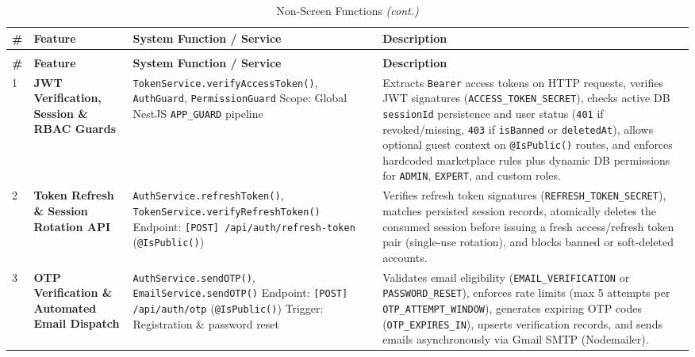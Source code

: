 \begin{longtable}{|C{0.7cm}|L{3.2cm}|S{5.4cm}|p{5.8cm}|}
\caption{Non-Screen Functions}
\label{tab:non-screen-functions} \\
\hline
{}
\textbf{\#} & \textbf{Feature} & \textbf{System Function / Service} & \textbf{Description} \\
\hline
\endfirsthead

\caption[]{Non-Screen Functions \textit{(cont.)}} \\
\hline
{}
\textbf{\#} & \textbf{Feature} & \textbf{System Function / Service} & \textbf{Description} \\
\hline
\endhead

\hline
\endfoot

\hline
\endlastfoot

1 &
\textbf{JWT Verification, Session \& RBAC Guards} &
\texttt{TokenService.\allowbreak{}verifyAccessToken()}, \texttt{AuthGuard}, \texttt{PermissionGuard} \newline
Scope: Global NestJS \texttt{APP\_GUARD} pipeline &
Extracts \texttt{Bearer} access tokens on HTTP requests, verifies JWT signatures (\texttt{ACCESS\_\allowbreak{}TOKEN\_\allowbreak{}SECRET}), checks active DB \texttt{sessionId} persistence and user status (\texttt{401} if revoked/missing, \texttt{403} if \texttt{isBanned} or \texttt{deletedAt}), allows optional guest context on \texttt{@IsPublic()} routes, and enforces hardcoded marketplace rules plus dynamic DB permissions for \texttt{ADMIN}, \texttt{EXPERT}, and custom roles.
\\ \hline

2 &
\textbf{Token Refresh \& Session Rotation API} &
\texttt{AuthService.\allowbreak{}refreshToken()}, \texttt{TokenService.\allowbreak{}verifyRefreshToken()} \newline
Endpoint: \texttt{[POST] /api/\allowbreak{}auth/\allowbreak{}refresh-token} (\texttt{@IsPublic()}) &
Verifies refresh token signatures (\texttt{REFRESH\_\allowbreak{}TOKEN\_\allowbreak{}SECRET}), matches persisted session records, atomically deletes the consumed session before issuing a fresh access/refresh token pair (single-use rotation), and blocks banned or soft-deleted accounts.
\\ \hline

3 &
\textbf{OTP Verification \& Automated Email Dispatch} &
\texttt{AuthService.\allowbreak{}sendOTP()}, \texttt{EmailService.\allowbreak{}sendOTP()} \newline
Endpoint: \texttt{[POST] /api/\allowbreak{}auth/otp} (\texttt{@IsPublic()}) \newline
Trigger: Registration \& password reset &
Validates email eligibility (\texttt{EMAIL\_\allowbreak{}VERIFICATION} or \texttt{PASSWORD\_\allowbreak{}RESET}), enforces rate limits (max 5 attempts per \texttt{OTP\_\allowbreak{}ATTEMPT\_\allowbreak{}WINDOW}), generates expiring OTP codes (\texttt{OTP\_\allowbreak{}EXPIRES\_IN}), upserts verification records, and sends emails asynchronously via Gmail SMTP (Nodemailer).
\\ \hline


\end{longtable}
